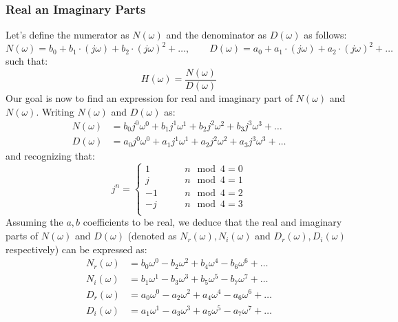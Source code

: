\subsubsection{Real an Imaginary Parts} 
Let's define the numerator as $N(\omega)$ and the denominator as $D(\omega)$ as follows:
\begin{equation}
 N(\omega) = b_0 + b_1 \cdot (j \omega) + b_2 \cdot (j \omega)^2 + \ldots, \qquad
 D(\omega) = a_0 + a_1 \cdot (j \omega) + a_2 \cdot (j \omega)^2 + \ldots
\end{equation} 
such that:
\begin{equation}
 H(\omega) = \frac{N(\omega)}{D(\omega)}
\end{equation} 
Our goal is now to find an expression for real and imaginary part of $N(\omega)$ and $N(\omega)$. Writing $N(\omega)$ and $D(\omega)$ as:
\begin{equation}
\begin{aligned}
 N(\omega) &= b_0 j^0 \omega^0 + b_1 j^1 \omega^1 + b_2 j^2 \omega^2 + b_3 j^3 \omega^3 + \ldots \\
 D(\omega) &= a_0 j^0 \omega^0 + a_1 j^1 \omega^1 + a_2 j^2 \omega^2 + a_3 j^3 \omega^3 + \ldots 
\end{aligned}
\end{equation} 
and recognizing that:
\begin{equation}
 j^n = 
 \begin{cases}
 1  \qquad & n \mod 4 = 0  \\
 j  \qquad & n \mod 4 = 1  \\
 -1 \qquad & n \mod 4 = 2  \\
 -j \qquad & n \mod 4 = 3  \\ 
 \end{cases}
\end{equation} 
Assuming the $a, b$ coefficients to be real, we deduce that the real and imaginary parts of $N(\omega)$ and $D(\omega)$ (denoted as $N_r(\omega), N_i(\omega)$ and $D_r(\omega), D_i(\omega)$ respectively) can be expressed as:
\begin{equation}
\begin{aligned}
 N_r(\omega) &= b_0 \omega^0 - b_2 \omega^2 + b_4 \omega^4 - b_6 \omega^6 + \ldots \\
 N_i(\omega) &= b_1 \omega^1 - b_3 \omega^3 + b_5 \omega^5 - b_7 \omega^7 + \ldots \\
 D_r(\omega) &= a_0 \omega^0 - a_2 \omega^2 + a_4 \omega^4 - a_6 \omega^6 + \ldots \\
 D_i(\omega) &= a_1 \omega^1 - a_3 \omega^3 + a_5 \omega^5 - a_7 \omega^7 + \ldots \\ 
\end{aligned} 
\end{equation} 
